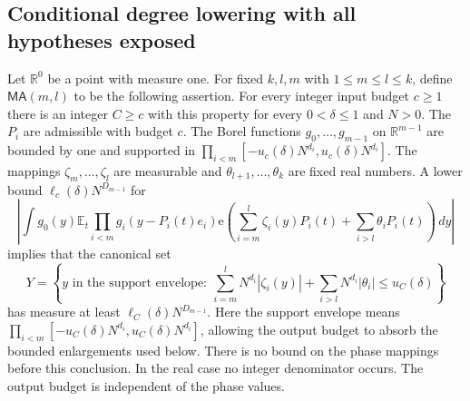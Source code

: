 \documentclass[11pt]{article}
\theoremstyle{definition}
\newcommand{\ee}[1]{\mathrm e\!\left(#1\right)}
\begin{document}
\subsection{Conditional degree lowering with all hypotheses exposed}\label{patch:conditional-dl}
Let $\mathbb R^0$ be a point with measure one.  For fixed $k,l,m$ with $1\leq m\leq l\leq k$,
define $\mathsf{MA}(m,l)$ to be the following assertion. For every integer input budget
$c\geq1$ there is an integer $C\geq c$ with this property for every $0<\delta\leq1$
and $N>0$. The $P_i$ are admissible with budget $c$. The Borel functions
$g_0,\ldots,g_{m-1}$ on $\mathbb R^{m-1}$ are bounded by one and supported in
$\prod_{i<m}[-u_c(\delta)N^{d_i},u_c(\delta)N^{d_i}]$.
The mappings $\zeta_m,\ldots,\zeta_l$ are measurable and
$\theta_{l+1},\ldots,\theta_k$ are fixed real numbers.
A lower bound $\ell_c(\delta)N^{D_{m-1}}$ for
\[
 \label{patch:ma-correlation}
 \left|\int g_0(y)\mathbb E_t\prod_{i<m}g_i(y-P_i(t)e_i)
       \ee{\sum_{i=m}^l\zeta_i(y)P_i(t)+\sum_{i>l}\theta_iP_i(t)}\,dy\right|
 \tag{\theequation}
\]
implies that the canonical set
\[
 \label{patch:ma-set}
 Y=\left\{y\text{ in the support envelope}:\
      \sum_{i=m}^lN^{d_i}|\zeta_i(y)|+\sum_{i>l}N^{d_i}|\theta_i|
                           \leq u_C(\delta)\right\}
 \tag{\theequation}
\]
has measure at least $\ell_C(\delta)N^{D_{m-1}}$. Here the support envelope means
$\prod_{i<m}[-u_C(\delta)N^{d_i},u_C(\delta)N^{d_i}]$, allowing the output budget to
absorb the bounded enlargements used below.
There is no bound on the phase mappings before this conclusion.  In the real case no
integer denominator occurs.  The output budget is independent of the phase values.
\end{document}
